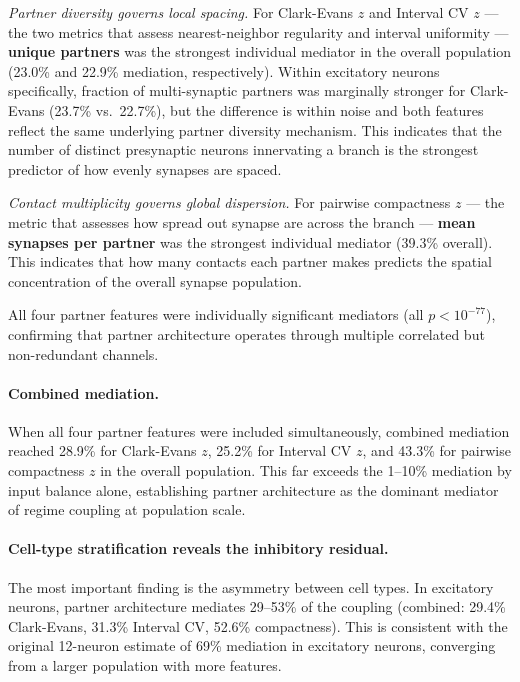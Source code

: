 \documentclass[11pt]{article}
\begin{document}
\textit{Partner diversity governs local spacing.} For Clark-Evans $z$ and Interval CV $z$ --- the two metrics that assess nearest-neighbor regularity and interval uniformity --- \textbf{unique partners} was the strongest individual mediator in the overall population (23.0\% and 22.9\% mediation, respectively). Within excitatory neurons specifically, fraction of multi-synaptic partners was marginally stronger for Clark-Evans (23.7\% vs.\ 22.7\%), but the difference is within noise and both features reflect the same underlying partner diversity mechanism. This indicates that the number of distinct presynaptic neurons innervating a branch is the strongest predictor of how evenly synapses are spaced.

\textit{Contact multiplicity governs global dispersion.} For pairwise compactness $z$ --- the metric that assesses how spread out synapse are across the branch --- \textbf{mean synapses per partner} was the strongest individual mediator (39.3\% overall). This indicates that how many contacts each partner makes predicts the spatial concentration of the overall synapse population.

All four partner features were individually significant mediators (all $p < 10^{-77}$), confirming that partner architecture operates through multiple correlated but non-redundant channels.

\paragraph{Combined mediation.} When all four partner features were included simultaneously, combined mediation reached 28.9\% for Clark-Evans $z$, 25.2\% for Interval CV $z$, and 43.3\% for pairwise compactness $z$ in the overall population. This far exceeds the 1--10\% mediation by input balance alone, establishing partner architecture as the dominant mediator of regime coupling at population scale.

\paragraph{Cell-type stratification reveals the inhibitory residual.} The most important finding is the asymmetry between cell types. In excitatory neurons, partner architecture mediates 29--53\% of the coupling (combined: 29.4\% Clark-Evans, 31.3\% Interval CV, 52.6\% compactness). This is consistent with the original 12-neuron estimate of 69\% mediation in excitatory neurons, converging from a larger population with more features.
\end{document}
